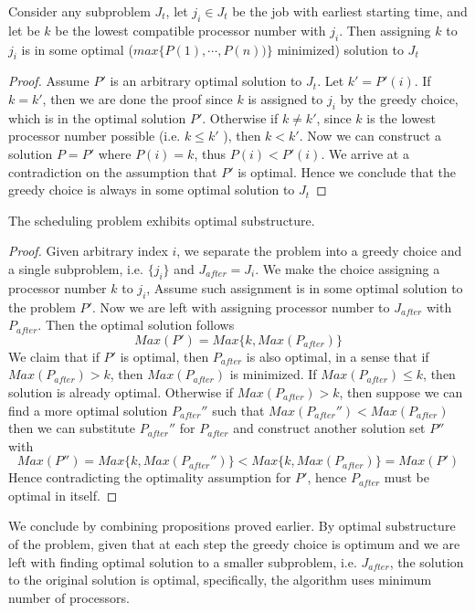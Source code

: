 \documentclass[11pt]{article}
\begin{document}
\begin{enumerate}
  \begin{proposition*}
    Consider any subproblem $J_t$, let $j_i \in J_t$ be the job with earliest starting time, and let be $k$ be the lowest compatible processor number with $j_i$. Then assigning $k$ to $j_i$ is in some optimal ($max\{ P(1), \cdots, P(n) )\}$ minimized) solution to $J_t$
   \end{proposition*}
  \begin{proof}
    Assume $P'$ is an arbitrary optimal solution to $J_t$. Let $k' = P'(i)$. If $k = k'$, then we are done the proof since $k$ is assigned to $j_i$ by the greedy choice, which is in the optimal solution $P'$. Otherwise if $k \neq k'$, since $k$ is the lowest processor number possible (i.e. $k \leq k'$ ), then $k < k'$. Now we can construct a solution $P = P'$ where $P(i) = k$, thus $P(i) < P'(i)$. We arrive at a contradiction on the assumption that $P'$ is optimal. Hence we conclude that the greedy choice is always in some optimal solution to $J_t$
  \end{proof}

  \begin{proposition*}
    The scheduling problem exhibits optimal substructure.
  \end{proposition*}
  \begin{proof}
    Given arbitrary index $i$, we separate the problem into a greedy choice and a single subproblem, i.e. $\{ j_i\}$ and $J_{after} = J_i$. We make the choice assigning a processor number $k$ to $j_i$, Assume such assignment is in some optimal solution to the problem $P'$. Now we are left with assigning processor number to $J_{after}$ with $P_{after}$. Then the optimal solution follows
    \[
      Max(P') = Max\{k, Max(P_{after}) \}
    \]
    We claim that if $P'$ is optimal, then $P_{after}$ is also optimal, in a sense that if $Max(P_{after}) > k$, then $Max(P_{after})$ is minimized. If $Max(P_{after}) \leq k$, then solution is already optimal. Otherwise if $Max(P_{after})>k$, then suppose we can find a more optimal solution $P_{after}''$ such that $Max(P_{after}'') < Max(P_{after})$ then we can substitute $P_{after}''$ for $P_{after}$ and construct another solution set $P''$ with
    \[
      Max(P'') = Max\{k, Max(P_{after}'')\} < Max\{k, Max(P_{after})\} = Max(P')
    \]
    Hence contradicting the optimality assumption for $P'$, hence $P_{after}$ must be optimal in itself.
  \end{proof}

  We conclude by combining propositions proved earlier. By optimal substructure of the problem, given that at each step the greedy choice is optimum and we are left with finding optimal solution to a smaller subproblem, i.e. $J_{after}$, the solution to the original solution is optimal, specifically, the algorithm uses minimum number of processors.


\end{enumerate}
\end{document}
